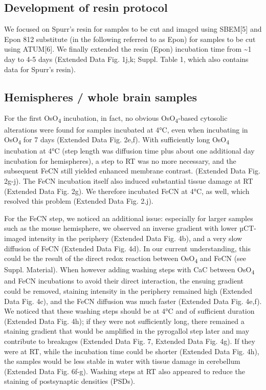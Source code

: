 \documentclass{article}
\begin{document}
\subsection*{Development of resin protocol}


We focused on Spurr’s resin for samples to be cut and imaged using SBEM[5] and Epon 812 substitute (in the following referred to as Epon) for samples to be cut using ATUM[6].  We finally extended the resin (Epon) incubation time from \textasciitilde{}1 day to 4-5 days (Extended Data Fig. 1j,k; Suppl. Table 1, which also contains data for Spurr’s resin). 

\subsection*{Hemispheres / whole brain samples}


For the first OsO\textsubscript{4} incubation, in fact, no obvious OsO\textsubscript{4}-based cytosolic alterations were found for samples incubated at 4°C, even when incubating in OsO\textsubscript{4} for 7 days (Extended Data Fig. 2e,f). With sufficiently long OsO\textsubscript{4} incubation at 4°C (step length was diffusion time plus about one additional day incubation for hemispheres), a step to RT was no more necessary, and the subsequent FeCN still yielded enhanced membrane contrast. (Extended Data Fig. 2g-j). The FeCN incubation itself also induced substantial tissue damage at RT (Extended Data Fig. 2g). We therefore incubated FeCN at 4°C, as well, which resolved this problem (Extended Data Fig. 2.j). 

For the FeCN step, we noticed an additional issue: especially for larger samples such as the mouse hemisphere, we observed an inverse gradient with lower µCT-imaged intensity in the periphery (Extended Data Fig. 4b), and a very slow diffusion of FeCN (Extended Data Fig. 4d). In our current understanding, this could be the result of the direct redox reaction between OsO\textsubscript{4} and FeCN (see Suppl. Material). When however adding washing steps with CaC between OsO\textsubscript{4} and FeCN incubations to avoid their direct interaction, the ensuing gradient could be removed, staining intensity in the periphery remained high (Extended Data Fig. 4c), and the FeCN diffusion was much faster (Extended Data Fig. 4e,f). We noticed that these washing steps should be at 4°C and of sufficient duration (Extended Data Fig. 4h); if they were not sufficiently long, there remained a staining gradient that would be amplified in the pyrogallol step later and may contribute to breakages (Extended Data Fig. 7, Extended Data Fig. 4g). If they were at RT, while the incubation time could be shorter (Extended Data Fig. 4h), the samples would be less stable in water with tissue damage in cerebellum (Extended Data Fig. 6f-g). Washing steps at RT also appeared to reduce the staining of postsynaptic densities (PSDs). 
\end{document}
